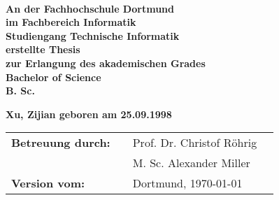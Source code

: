 \thispagestyle{empty}


\begin{center}
\textbf{\Large{~\titleDocument}}
\end{center}
\begin{verbatim}





\end{verbatim}
\begin{center}
\doublespacing
\textbf{\LARGE{\subjectDocument}}\\
\singlespacing
\end{center}
\begin{verbatim}
















\end{verbatim}
\begin{center}
\textbf{
    An der Fachhochschule Dortmund \\
    im Fachbereich Informatik \\
    Studiengang Technische Informatik \\
    erstellte Thesis \\
    zur Erlangung des akademischen Grades \\
    Bachelor of Science \\
    B. Sc. \\
}
\end{center}
\begin{center}
    \textbf{Xu, Zijian \linebreak
    geboren am 25.09.1998 
    }
\end{center}
\begin{flushleft}
\begin{tabular}{llll}
\textbf{Betreuung durch:} & & Prof. Dr. Christof Röhrig &\\
    & & M. Sc. Alexander Miller &\\
\textbf{Version vom:} & & Dortmund, \today &\\
\end{tabular}
\end{flushleft}
